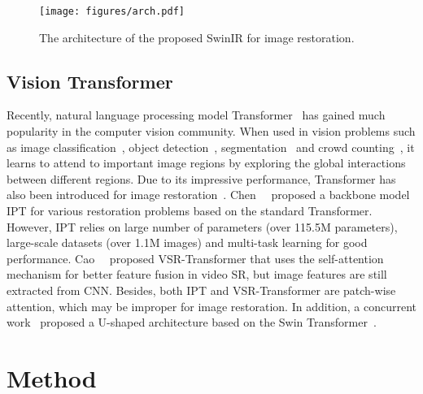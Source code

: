\documentclass[10pt,twocolumn,letterpaper]{article}
\newlength \g
\begin{document}
\begin{figure*}[ht]
\captionsetup{font=small}\scriptsize
\begin{center}
\texttt{[image: figures/arch.pdf]}\label{fig:SwinIR_SR}\vspace{-0.3cm}
\caption{The architecture of the proposed SwinIR for image restoration.}\label{fig:architecture}
\end{center}
\vspace{-0.3cm}
\end{figure*}



\subsection{Vision Transformer}
Recently, natural language processing model Transformer~\cite{vaswani2017transformer} has gained much popularity in the computer vision community. When used in vision problems such as image classification~\cite{ramachandran2019SASA, dosovitskiy2020ViT, wu2020visual, liu2021swin, li2021localvit, liu2021transformer, vaswani2021SAhaloing}, object detection~\cite{carion2020DETR, liu2020deep, touvron2020DeiT, liu2021swin}, segmentation~\cite{wu2020visual, zheng2021rethinking, liu2021swin, cao2021swinunet} and crowd counting~\cite{liang2021transcrowd,sun2021boosting}, it learns to attend to important image regions by exploring the global interactions between different regions. 
Due to its impressive performance, Transformer has also been introduced for image restoration~\cite{chen2021IPT, cao2021videosr, wang2021uformer}.
Chen~\etal~\cite{chen2021IPT} proposed a backbone model IPT for various restoration problems based on the standard Transformer. However, IPT relies on large number of parameters (over 115.5M parameters), large-scale datasets (over 1.1M images) and multi-task learning for good performance. Cao~\etal~\cite{cao2021videosr} proposed VSR-Transformer that uses the self-attention mechanism for better feature fusion in video SR, but image features are still extracted from CNN. Besides, both IPT and VSR-Transformer are patch-wise attention, which may be improper for image restoration. In addition, a concurrent work~\cite{wang2021uformer} proposed a U-shaped architecture based on the Swin Transformer~\cite{liu2021swin}.



\section{Method}
\end{document}
